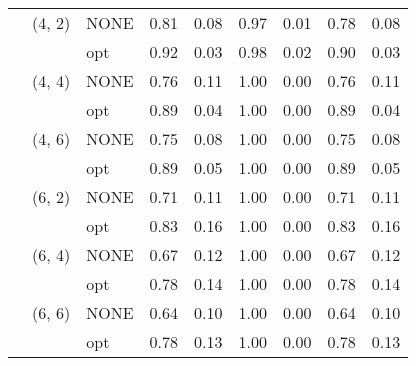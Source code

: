 \begin{tabular}{lllrrrrrr}
    & (4, 2) & NONE &     0.81 & 0.08 &     0.97 & 0.01 &  0.78 & 0.08 \\
    &        & opt &     0.92 & 0.03 &     0.98 & 0.02 &  0.90 & 0.03 \\
    & (4, 4) & NONE &     0.76 & 0.11 &     1.00 & 0.00 &  0.76 & 0.11 \\
    &        & opt &     0.89 & 0.04 &     1.00 & 0.00 &  0.89 & 0.04 \\
    & (4, 6) & NONE &     0.75 & 0.08 &     1.00 & 0.00 &  0.75 & 0.08 \\
    &        & opt &     0.89 & 0.05 &     1.00 & 0.00 &  0.89 & 0.05 \\
    & (6, 2) & NONE &     0.71 & 0.11 &     1.00 & 0.00 &  0.71 & 0.11 \\
    &        & opt &     0.83 & 0.16 &     1.00 & 0.00 &  0.83 & 0.16 \\
    & (6, 4) & NONE &     0.67 & 0.12 &     1.00 & 0.00 &  0.67 & 0.12 \\
    &        & opt &     0.78 & 0.14 &     1.00 & 0.00 &  0.78 & 0.14 \\
    & (6, 6) & NONE &     0.64 & 0.10 &     1.00 & 0.00 &  0.64 & 0.10 \\
    &        & opt &     0.78 & 0.13 &     1.00 & 0.00 &  0.78 & 0.13 \\
\bottomrule
\end{tabular}
